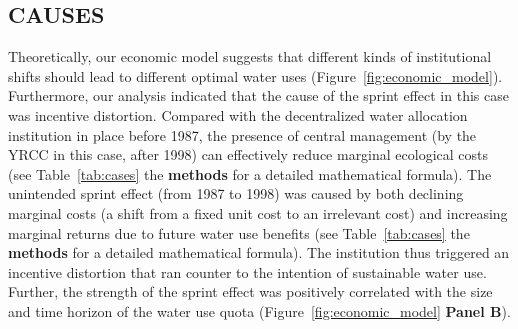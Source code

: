 \documentclass{nsr}
\begin{document}
\subsection{CAUSES}\label{causes}
Theoretically, our economic model suggests that different kinds of institutional shifts should lead to different optimal water uses (Figure~\ref{fig:economic_model}).
Furthermore, our analysis indicated that the cause of the sprint effect in this case was incentive distortion.
Compared with the decentralized water allocation institution in place before 1987, the presence of central management (by the YRCC in this case, after 1998) can effectively reduce marginal ecological costs (see Table~\ref{tab:cases} the \textbf{methods} for a detailed mathematical formula).
The unintended sprint effect (from 1987 to 1998) was caused by both declining marginal costs (a shift from a fixed unit cost to an irrelevant cost) and increasing marginal returns due to future water use benefits (see Table~\ref{tab:cases} the \textbf{methods} for a detailed mathematical formula).
The institution thus triggered an incentive distortion that ran counter to the intention of sustainable water use. Further, the strength of the sprint effect was positively correlated with the size and time horizon of the water use quota (Figure~\ref{fig:economic_model} \textbf{Panel B}).
\end{document}
